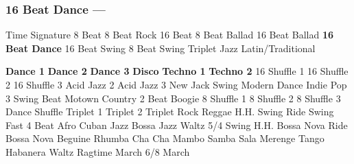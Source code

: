 \subsubsection[16 Beat Dance]{16 Beat Dance --- \UiKey{\II}\UiKey{\MET}}
Time Signature
8 Beat
8 Beat Rock
16 Beat
8 Beat Ballad
16 Beat Ballad
\textbf{16 Beat Dance}
16 Beat Swing
8 Beat Swing
Triplet
Jazz
Latin/Traditional





























\textbf{Dance 1}
\textbf{Dance 2}
\textbf{Dance 3}
\textbf{Disco}
\textbf{Techno 1}
\textbf{Techno 2}
16 Shuffle 1
16 Shuffle 2
16 Shuffle 3
Acid Jazz 2
Acid Jazz 3
New Jack Swing
Modern Dance
Indie Pop 3
Swing Beat
Motown
Country 2 Beat
Boogie
8 Shuffle 1
8 Shuffle 2
8 Shuffle 3
Dance Shuffle
Triplet 1
Triplet 2
Triplet Rock
Reggae
H.H. Swing
Ride Swing
Fast 4 Beat
Afro Cuban
Jazz Bossa
Jazz Waltz
5/4 Swing
H.H. Bossa Nova
Ride Bossa Nova
Beguine
Rhumba
Cha Cha
Mambo
Samba
Sala
Merenge
Tango
Habanera
Waltz
Ragtime
March
6/8 March
